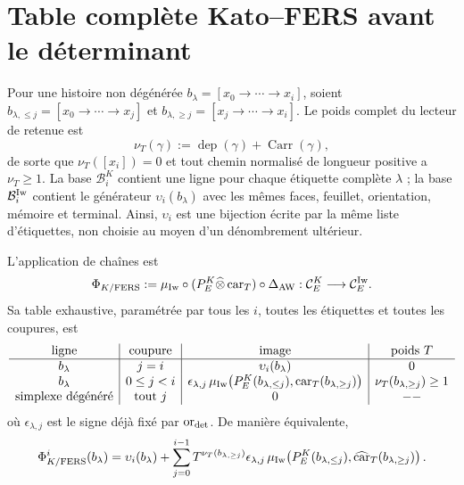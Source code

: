 \section{Table complète Kato--FERS avant le déterminant}

Pour une histoire non dégénérée
$b_\lambda=[x_0\to\cdots\to x_i]$, soient
$b_{\lambda,\le j}=[x_0\to\cdots\to x_j]$ et
$b_{\lambda,\ge j}=[x_j\to\cdots\to x_i]$. Le poids complet du lecteur
de retenue est
\begin{equation}\label{eq:pdf2-bsd-peso-t}
 \nu_T(\gamma):=\operatorname{dep}(\gamma)
                 +\operatorname{Carr}(\gamma),
\end{equation}
de sorte que $\nu_T([x_i])=0$ et tout chemin normalisé de longueur positive
a $\nu_T\ge1$. La base $\mathcal B_i^K$ contient une ligne pour chaque
étiquette complète $\lambda$ ; la base $\mathcal B_i^{\rm Iw}$ contient le
générateur $\upsilon_i(b_\lambda)$ avec les mêmes faces, feuillet, orientation,
mémoire et terminal. Ainsi, $\upsilon_i$ est une bijection écrite par la
même liste d'étiquettes, non choisie au moyen d'un dénombrement ultérieur.

L'application de chaînes est
\begin{equation}\label{eq:pdf2-bsd-phi-kato}
 \Phi_{K/{\rm FERS}}:=
 \mu_{\rm Iw}\circ(P_E^K\widehat\otimes\operatorname{car}_T)
 \circ\Delta_{\rm AW}:
 \mathcal C_E^K\longrightarrow\mathcal C_E^{\rm Iw}.
\end{equation}
Sa table exhaustive, paramétrée par tous les $i$, toutes les étiquettes et
toutes les coupures, est
\begin{equation}\label{eq:pdf2-bsd-tabla-kato-fers}
\begin{array}{c|c|c|c}
 \text{ligne}&\text{coupure}&\text{image}&\text{poids }T\\ \hline
 b_\lambda&j=i&\upsilon_i(b_\lambda)&0\\
 b_\lambda&0\le j<i&
 \epsilon_{\lambda,j}\,
 \mu_{\rm Iw}\!\left(P_E^K(b_{\lambda,\le j}),
       \operatorname{car}_T(b_{\lambda,\ge j})\right)&
 \nu_T(b_{\lambda,\ge j})\ge1\\
 \text{simplexe dégénéré}&\text{tout }j&0&--
\end{array}
\end{equation}
où $\epsilon_{\lambda,j}$ est le signe déjà fixé par
$\operatorname{or}_{\rm det}$. De manière équivalente,
\begin{equation}\label{eq:pdf2-bsd-expansion-kato-fers}
 \Phi_{K/{\rm FERS}}^i(b_\lambda)
 =\upsilon_i(b_\lambda)+
  \sum_{j=0}^{i-1}T^{\nu_T(b_{\lambda,\ge j})}
  \epsilon_{\lambda,j}\,
  \mu_{\rm Iw}\!\left(P_E^K(b_{\lambda,\le j}),
          \widehat{\operatorname{car}}_T(b_{\lambda,\ge j})\right).
\end{equation}

